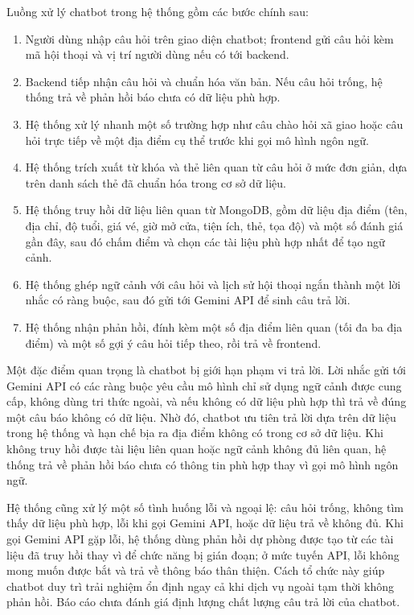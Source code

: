﻿\documentclass[../DoAn.tex]{subfiles}
\begin{document}
Luồng xử lý chatbot trong hệ thống gồm các bước chính sau:
\begin{enumerate}[leftmargin=1.6cm]
\item Người dùng nhập câu hỏi trên giao diện chatbot; frontend gửi câu hỏi kèm mã hội thoại và vị trí người dùng nếu có tới backend.
\item Backend tiếp nhận câu hỏi và chuẩn hóa văn bản. Nếu câu hỏi trống, hệ thống trả về phản hồi báo chưa có dữ liệu phù hợp.
\item Hệ thống xử lý nhanh một số trường hợp như câu chào hỏi xã giao hoặc câu hỏi trực tiếp về một địa điểm cụ thể trước khi gọi mô hình ngôn ngữ.
\item Hệ thống trích xuất từ khóa và thẻ liên quan từ câu hỏi ở mức đơn giản, dựa trên danh sách thẻ đã chuẩn hóa trong cơ sở dữ liệu.
\item Hệ thống truy hồi dữ liệu liên quan từ MongoDB, gồm dữ liệu địa điểm (tên, địa chỉ, độ tuổi, giá vé, giờ mở cửa, tiện ích, thẻ, tọa độ) và một số đánh giá gần đây, sau đó chấm điểm và chọn các tài liệu phù hợp nhất để tạo ngữ cảnh.
\item Hệ thống ghép ngữ cảnh với câu hỏi và lịch sử hội thoại ngắn thành một lời nhắc có ràng buộc, sau đó gửi tới Gemini API để sinh câu trả lời.
\item Hệ thống nhận phản hồi, đính kèm một số địa điểm liên quan (tối đa ba địa điểm) và một số gợi ý câu hỏi tiếp theo, rồi trả về frontend.
\end{enumerate}

Một đặc điểm quan trọng là chatbot bị giới hạn phạm vi trả lời. Lời nhắc gửi tới Gemini API có các ràng buộc yêu cầu mô hình chỉ sử dụng ngữ cảnh được cung cấp, không dùng tri thức ngoài, và nếu không có dữ liệu phù hợp thì trả về đúng một câu báo không có dữ liệu. Nhờ đó, chatbot ưu tiên trả lời dựa trên dữ liệu trong hệ thống và hạn chế bịa ra địa điểm không có trong cơ sở dữ liệu. Khi không truy hồi được tài liệu liên quan hoặc ngữ cảnh không đủ liên quan, hệ thống trả về phản hồi báo chưa có thông tin phù hợp thay vì gọi mô hình ngôn ngữ.

Hệ thống cũng xử lý một số tình huống lỗi và ngoại lệ: câu hỏi trống, không tìm thấy dữ liệu phù hợp, lỗi khi gọi Gemini API, hoặc dữ liệu trả về không đủ. Khi gọi Gemini API gặp lỗi, hệ thống dùng phản hồi dự phòng được tạo từ các tài liệu đã truy hồi thay vì để chức năng bị gián đoạn; ở mức tuyến API, lỗi không mong muốn được bắt và trả về thông báo thân thiện. Cách tổ chức này giúp chatbot duy trì trải nghiệm ổn định ngay cả khi dịch vụ ngoài tạm thời không phản hồi. Báo cáo chưa đánh giá định lượng chất lượng câu trả lời của chatbot.
\end{document}
